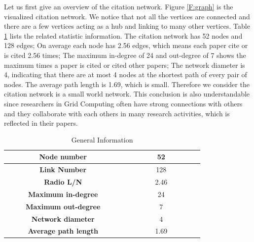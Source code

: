 Let us first give an overview of the citation network. Figure \ref{F:graph} is the visualized citation network. We notice that not all the vertices are connected and there are a few vertices acting as a hub and linking to many other vertices. Table \ref{T:papersname} lists the related statistic information. The citation network has 52 nodes and 128 edges; On average each node has 2.56 edges, which means each paper cite or is cited 2.56 times; The maximum in-degree of 24 and out-degree of 7 shows the maximum times a paper is cited or cited other papers; The network diameter is 4, indicating that there are at most 4 nodes at the shortest path of every pair of nodes. The average path length is 1.69, which is small. Therefore we consider the citation network is a small world network. This conclusion is also understandable since researchers in Grid Computing often have strong connections with others and they collaborate with each others in many research activities, which is reflected in their papers.

\begin{table}[htb]
\begin{center}
\begin {tabular}{|c|c|}
\hline
{\bf ~~~~~~~~Node number~~~~~~~~} & ~~~~~~~~52~~~~~~~~ \\
\hline
{\bf Link Number} & 128 \\
\hline
{\bf Radio L/N}& 2.46 \\
\hline
{\bf Maximum in-degree} & 24 \\
\hline
{\bf Maximum out-degree} & 7\\
\hline
{\bf Network diameter} & 4 \\
\hline
{\bf Average path length}& 1.69 \\
\hline
\end {tabular}
\caption{General Information}
\label {T:papersname}
\end{center}
\end {table}

